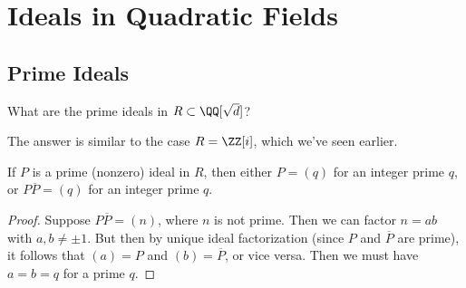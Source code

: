 













\section{Ideals in Quadratic Fields}

\subsection{Prime Ideals}

\vspace{0.75em}

\begin{qq}
What are the prime ideals in $R \subset \QQ[\sqrt{d}]$?
\end{qq}


The answer is similar to the case $R = \ZZ[i]$, which we've seen earlier.

\begin{lemma}
If $P$ is a prime (nonzero) ideal in $R$, then either $P = (q)$ for an integer prime $q$, or $P\overline{P} = (q)$ for an integer prime $q$. 
\end{lemma}

\begin{proof}
Suppose $P\overline{P} = (n)$, where $n$ is not prime. Then we can factor $n = ab$ with $a, b \neq \pm 1$. But then by unique ideal factorization (since $P$ and $\overline{P}$ are prime), it follows that $(a) = P$ and $(b) = \overline{P}$, or vice versa. Then we must have $a = b = q$ for a prime $q$. 
\end{proof}

